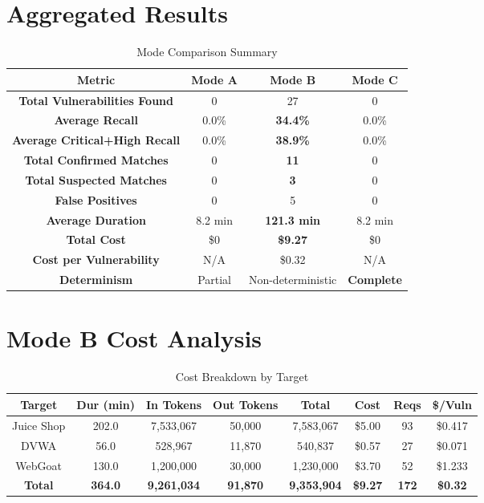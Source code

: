 \documentclass[12pt,a4paper,oneside]{book}
\begin{document}
\section{Aggregated Results}

\begin{table}[h]
\centering
\caption{Mode Comparison Summary}
\label{tab:mode_summary}
\begin{tabular}{|c|c|c|c|}
\hline
\textbf{Metric} & \textbf{Mode A} & \textbf{Mode B} & \textbf{Mode C} \\ \hline
\textbf{Total Vulnerabilities Found} & 0 & 27 & 0 \\ \hline
\textbf{Average Recall} & 0.0\% & \textbf{34.4\%} & 0.0\% \\ \hline
\textbf{Average Critical+High Recall} & 0.0\% & \textbf{38.9\%} & 0.0\% \\ \hline
\textbf{Total Confirmed Matches} & 0 & \textbf{11} & 0 \\ \hline
\textbf{Total Suspected Matches} & 0 & \textbf{3} & 0 \\ \hline
\textbf{False Positives} & 0 & 5 & 0 \\ \hline
\textbf{Average Duration} & 8.2 min & \textbf{121.3 min} & 8.2 min \\ \hline
\textbf{Total Cost} & \$0 & \textbf{\$9.27} & \$0 \\ \hline
\textbf{Cost per Vulnerability} & N/A & \$0.32 & N/A \\ \hline
\textbf{Determinism} & Partial & Non-deterministic & \textbf{Complete} \\ \hline
\end{tabular}
\end{table}

\section{Mode B Cost Analysis}

\begin{table}[h]
\centering
\caption{Cost Breakdown by Target}
\label{tab:cost_breakdown}
\begin{tabular}{|c|c|c|c|c|c|c|c|}
\hline
\textbf{Target} & \textbf{Dur (min)} & \textbf{In Tokens} & \textbf{Out Tokens} & \textbf{Total} & \textbf{Cost} & \textbf{Reqs} & \textbf{\$/Vuln} \\ \hline
Juice Shop & 202.0 & 7,533,067 & 50,000 & 7,583,067 & \$5.00 & 93 & \$0.417 \\ \hline
DVWA & 56.0 & 528,967 & 11,870 & 540,837 & \$0.57 & 27 & \$0.071 \\ \hline
WebGoat & 130.0 & 1,200,000 & 30,000 & 1,230,000 & \$3.70 & 52 & \$1.233 \\ \hline
\textbf{Total} & \textbf{364.0} & \textbf{9,261,034} & \textbf{91,870} & \textbf{9,353,904} & \textbf{\$9.27} & \textbf{172} & \textbf{\$0.32} \\ \hline
\end{tabular}
\end{table}
\end{document}
